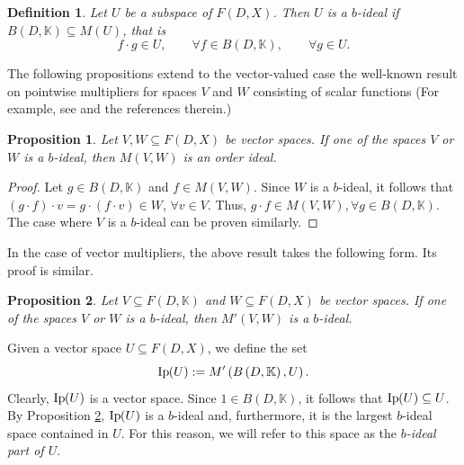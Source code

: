 \documentclass[14pt, a4paper]{article}  %
\providecommand{\pare}[1]{\left( #1\right) }
\newcommand{\K}{\mathbb{K}}
\newcommand{\Mt}{M'}
\newtheorem{proposition}{Proposition}[section]
\newtheorem{definition}{Definition}[section]
\begin{document}
	
	\begin{definition}\label{lola108}
		Let $U$ be a subspace of $F(D, X)$. Then $U$ is a \emph{$b$-ideal} if $B(D,\K) \subseteq M(U)$, that is \begin{equation}
			f \cdot g \in U,\qquad  \forall f \in B(D, \K),\qquad  \forall g \in U.
		\end{equation} 
	\end{definition} 
	
	
	
	The following propositions extend to the vector-valued case the well-known result on pointwise multipliers for spaces $V$ and $W$ consisting of scalar functions (For example, see \cite[Prop. 2]{MP} and the references therein.) 
	
\begin{proposition}\label{d274_2}\label{lola100_0} \label{d273_3}\label{lola83_0} 
	Let $V,W\subseteq F\pare{D,X}$ be vector spaces.  If one of the spaces $V$ or $W$ is a  $b$-ideal, then $M\pare{V,W}$ is an order ideal.  
\end{proposition}
\begin{proof}
	   Let $g\in B\pare{D,\K}$ and $f\in M\pare{V,W}$. Since $W$ is a $b$-ideal, it follows that $(g\cdot f)\cdot v = g\cdot \pare{f\cdot v} \in W$, $\forall v\in V.$ 
	Thus, $g\cdot f \in M\pare{V,W}, \forall g\in B\pare{D,\K}$. The case where $V$ is a  $b$-ideal    can be proven similarly. 
\end{proof}

In the case of vector multipliers, the above result takes the following form. Its proof is similar.

\begin{proposition}\label{lola99_0}   Let $V \subseteq F\pare{D, \K}$ and $W \subseteq F\pare{D, X}$ be vector spaces. If one of the spaces $V$ or $W$ is a $b$-ideal, then $M'\pare{V, W}$ is a $b$-ideal.  
\end{proposition}
%	
	
	Given a vector space $U \subseteq F\pare{D, X}$, we define the set
	\begin{equation}\label{d331_0}
		\text{Ip}\hspace{-2pt}\pare{U}:=M'\pare{B\pare{D,\K}, U}.
	\end{equation}
	Clearly, $\text{Ip}\hspace{-2pt}\pare{U}$ is a vector space. Since $\mathit{1} \in B\pare{D, \K}$, it follows that $\text{Ip}\hspace{-2pt}\pare{U} \subseteq U$. By Proposition \ref{lola99_0}, $\text{Ip}\hspace{-2pt}\pare{U}$ is  a $b$-ideal and, furthermore, it is the largest $b$-ideal  space contained in $U$. For this reason, we will refer to this space as the \emph{$b$-ideal  part of $U$}.
	
\end{document}
